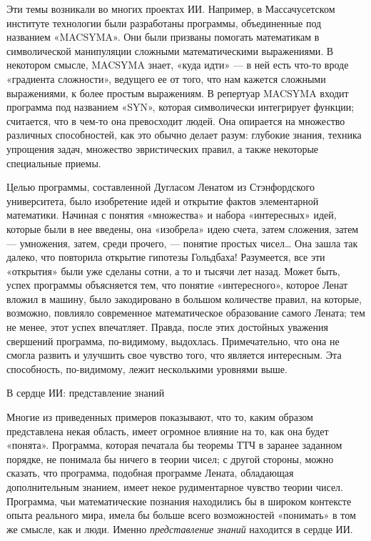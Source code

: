 \documentclass[../main.tex]{subfiles}
\begin{document}
Эти темы возникали во многих проектах ИИ. Например, в Массачусетском институте технологии были разработаны программы, объединенные под названием «MACSYMA». Они были призваны помогать математикам в символической манипуляции сложными математическими выражениями. В некотором смысле, MACSYMA знает, «куда идти» --- в ней есть что-то вроде «градиента сложности», ведущего ее от того, что нам кажется сложными выражениями, к более простым выражениям. В репертуар MACSYMA входит программа под названием «SYN», которая символически интегрирует функции; считается, что в чем-то она превосходит людей. Она опирается на множество различных способностей, как это обычно делает разум: глубокие знания, техника упрощения задач, множество эвристических правил, а также некоторые специальные приемы.

Целью программы, составленной Дугласом Ленатом из Стэнфордского университета, было изобретение идей и открытие фактов элементарной математики. Начиная с понятия «множества» и набора «интересных» идей, которые были в нее введены, она «изобрела» идею счета, затем сложения, затем --- умножения, затем, среди прочего, --- понятие простых чисел\ldots{} Она зашла так далеко, что повторила открытие гипотезы Гольдбаха! Разумеется, все эти «открытия» были уже сделаны сотни, а то и тысячи лет назад. Может быть, успех программы объясняется тем, что понятие «интересного», которое Ленат вложил в машину, было закодировано в большом количестве правил, на которые, возможно, повлияло современное математическое образование самого Лената; тем не менее, этот успех впечатляет. Правда, после этих достойных уважения свершений программа, по-видимому, выдохлась. Примечательно, что она не смогла развить и улучшить свое чувство того, что является интересным. Эта способность, по-видимому, лежит несколькими уровнями выше.

В сердце ИИ: представление знаний

Многие из приведенных примеров показывают, что то, каким образом представлена некая область, имеет огромное влияние на то, как она будет «понята». Программа, которая печатала бы теоремы ТТЧ в заранее заданном порядке, не понимала бы ничего в теории чисел; с другой стороны, можно сказать, что программа, подобная программе Лената, обладающая дополнительным знанием, имеет некое рудиментарное чувство теории чисел. Программа, чьи математические познания находились бы в широком контексте опыта реального мира, имела бы больше всего возможностей «понимать» в том же смысле, как и люди. Именно \emph{представление знаний} находится в сердце ИИ.
\end{document}
